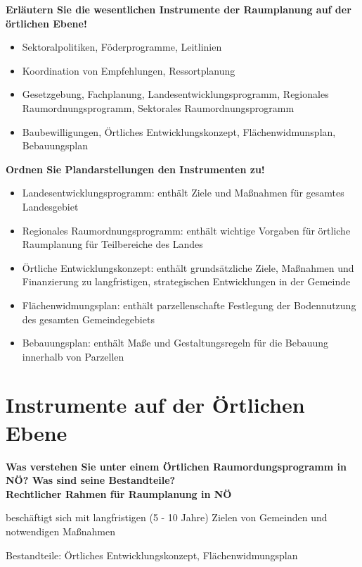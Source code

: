 \documentclass[]{article}
\newenvironment{question}{\vspace{8mm}\noindent\bfseries}{\\}
\begin{document}
\begin{question}
	Erläutern Sie die wesentlichen Instrumente der Raumplanung auf der örtlichen Ebene!
\end{question}
\begin{itemize}
	\item Sektoralpolitiken, Föderprogramme, Leitlinien
	\item Koordination von Empfehlungen, Ressortplanung
	\item Gesetzgebung, Fachplanung, Landesentwicklungsprogramm, Regionales Raumordnungsprogramm, Sektorales Raumordnungsprogramm
	\item Baubewilligungen, Örtliches Entwicklungskonzept, Flächenwidmunsplan, Bebauungsplan
\end{itemize}


\begin{question}
	Ordnen Sie Plandarstellungen den Instrumenten zu!
\end{question}
\begin{itemize}
	\item Landesentwicklungsprogramm: enthält Ziele und Maßnahmen für gesamtes Landesgebiet
	\item Regionales Raumordnungsprogramm: enthält wichtige Vorgaben für örtliche Raumplanung für Teilbereiche des Landes
	\item Örtliche Entwicklungskonzept: enthält grundsätzliche Ziele, Maßnahmen und Finanzierung zu langfristigen, strategischen Entwicklungen in der Gemeinde
	\item Flächenwidmungsplan: enthält parzellenschafte Festlegung der Bodennutzung des gesamten Gemeindegebiets
	\item Bebauungsplan: enthält Maße und Gestaltungsregeln für die Bebauung innerhalb von Parzellen
\end{itemize}


\section{Instrumente auf der Örtlichen Ebene}
\begin{question}
	Was verstehen Sie unter einem Örtlichen Raumordungsprogramm in NÖ? Was sind seine Bestandteile?
\end{question}
Rechtlicher Rahmen für Raumplanung in NÖ

beschäftigt sich mit langfristigen (5 - 10 Jahre) Zielen von Gemeinden und notwendigen Maßnahmen

Bestandteile: Örtliches Entwicklungskonzept, Flächenwidmungsplan
\end{document}
